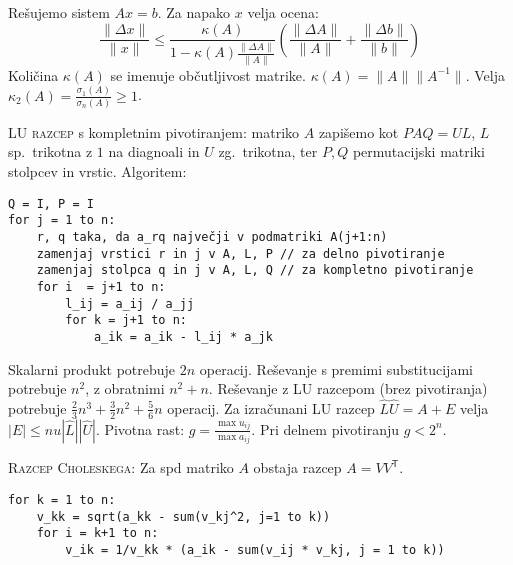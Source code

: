 \documentclass[a4paper,10pt]{article}
\theoremstyle{definition}
\newenvironment{enumerate*}%
{
\vspace{-6pt}
\begin{enumerate}
\setlength{\itemsep}{0pt}
\setlength{\parskip}{2pt}
}
{\end{enumerate}}
\newcommand{\T}{\mathsf{T}\!}
\begin{document}
Rešujemo sistem $Ax=b$. Za napako $x$ velja ocena:
\[ \frac{\|\Delta x\|}{\|x\|}  \leq \frac{\kappa(A)}{1-\kappa(A) \frac{\|\Delta
A\|}{\|A\|}} \left( \frac{\|\Delta A\|}{\|A\|} + \frac{\|\Delta
b\|}{\|b\|}\right) \]
Količina $\kappa(A)$ se imenuje občutljivost matrike. $\kappa(A) =
\|A\|\|A^{-1}\|$. Velja $\kappa_2(A) = \frac{\sigma_1(A)}{\sigma_n(A)} \geq 1$.

\textsc{LU razcep} s kompletnim pivotiranjem: matriko $A$ zapišemo kot $PAQ =
UL$, $L$ sp.\ trikotna z $1$ na diagnoali in $U$ zg.\ trikotna, ter $P, Q$
permutacijski matriki stolpcev in vrstic. Algoritem:
\scriptsize
\begin{verbatim}
Q = I, P = I
for j = 1 to n:
    r, q taka, da a_rq največji v podmatriki A(j+1:n)
    zamenjaj vrstici r in j v A, L, P // za delno pivotiranje
    zamenjaj stolpca q in j v A, L, Q // za kompletno pivotiranje
    for i  = j+1 to n:
        l_ij = a_ij / a_jj
        for k = j+1 to n:
            a_ik = a_ik - l_ij * a_jk
\end{verbatim}
\normalsize
%
%
%
Skalarni produkt potrebuje $2n$ operacij. Reševanje s premimi substitucijami
potrebuje $n^2$, z obratnimi $n^2+n$. Reševanje z LU razcepom (brez pivotiranja) potrebuje
$\frac23n^3 + \frac32n^2 + \frac56n$ operacij.
%
Za izračunani LU razcep $\hat{L}\hat{U} = A + E$ velja $|E| \leq
nu|\hat{L}||\hat{U}|$.
%
Pivotna rast: $g = \frac{\max u_{ij}}{\max a_{ij}}$. Pri delnem pivotiranju $g < 2^n$.

\textsc{Razcep Choleskega:}
Za spd matriko $A$ obstaja razcep $A = VV^\T$.
\scriptsize
\begin{verbatim}
for k = 1 to n:
    v_kk = sqrt(a_kk - sum(v_kj^2, j=1 to k))
    for i = k+1 to n:
        v_ik = 1/v_kk * (a_ik - sum(v_ij * v_kj, j = 1 to k))
\end{verbatim}
\normalsize
\end{document}
